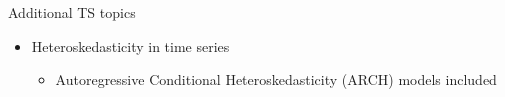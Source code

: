 \documentclass{beamer}
\begin{document}

\begin{frame}{Additional TS topics}
\begin{itemize}
\item Heteroskedasticity in time series
\vspace{1cm}
\begin{itemize}
\item Autoregressive Conditional Heteroskedasticity (ARCH) models included
\end{itemize}
\end{itemize}
\end{frame}
\end{document}

